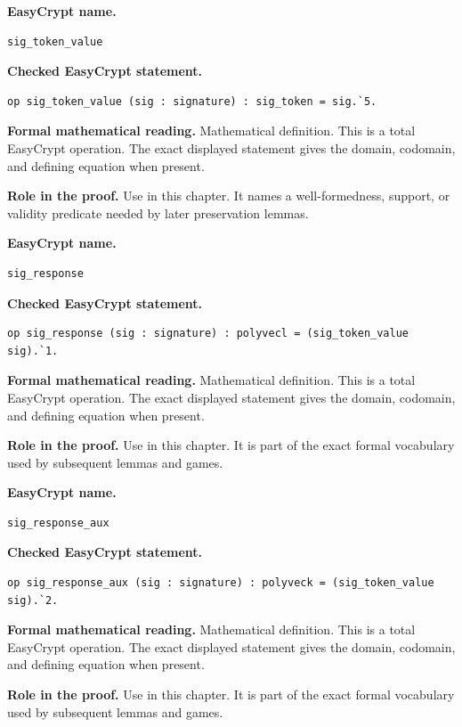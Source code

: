 \begin{formaldefinition}
\noindent\textbf{EasyCrypt name.}
\begin{lstlisting}[language=EasyCrypt,basicstyle=\ttfamily\scriptsize]
sig_token_value
\end{lstlisting}
\noindent\textbf{Checked EasyCrypt statement.}
\begin{lstlisting}[language=EasyCrypt,basicstyle=\ttfamily\scriptsize]
op sig_token_value (sig : signature) : sig_token = sig.`5.
\end{lstlisting}
\noindent\textbf{Formal mathematical reading.}
Mathematical definition. This is a total EasyCrypt operation.  The exact displayed statement gives the domain, codomain, and defining equation when present.

\noindent\textbf{Role in the proof.}
Use in this chapter. It names a well-formedness, support, or validity predicate needed by later preservation lemmas.

\end{formaldefinition}

\begin{formaldefinition}
\noindent\textbf{EasyCrypt name.}
\begin{lstlisting}[language=EasyCrypt,basicstyle=\ttfamily\scriptsize]
sig_response
\end{lstlisting}
\noindent\textbf{Checked EasyCrypt statement.}
\begin{lstlisting}[language=EasyCrypt,basicstyle=\ttfamily\scriptsize]
op sig_response (sig : signature) : polyvecl = (sig_token_value sig).`1.
\end{lstlisting}
\noindent\textbf{Formal mathematical reading.}
Mathematical definition. This is a total EasyCrypt operation.  The exact displayed statement gives the domain, codomain, and defining equation when present.

\noindent\textbf{Role in the proof.}
Use in this chapter. It is part of the exact formal vocabulary used by subsequent lemmas and games.

\end{formaldefinition}

\begin{formaldefinition}
\noindent\textbf{EasyCrypt name.}
\begin{lstlisting}[language=EasyCrypt,basicstyle=\ttfamily\scriptsize]
sig_response_aux
\end{lstlisting}
\noindent\textbf{Checked EasyCrypt statement.}
\begin{lstlisting}[language=EasyCrypt,basicstyle=\ttfamily\scriptsize]
op sig_response_aux (sig : signature) : polyveck = (sig_token_value sig).`2.
\end{lstlisting}
\noindent\textbf{Formal mathematical reading.}
Mathematical definition. This is a total EasyCrypt operation.  The exact displayed statement gives the domain, codomain, and defining equation when present.

\noindent\textbf{Role in the proof.}
Use in this chapter. It is part of the exact formal vocabulary used by subsequent lemmas and games.

\end{formaldefinition}

